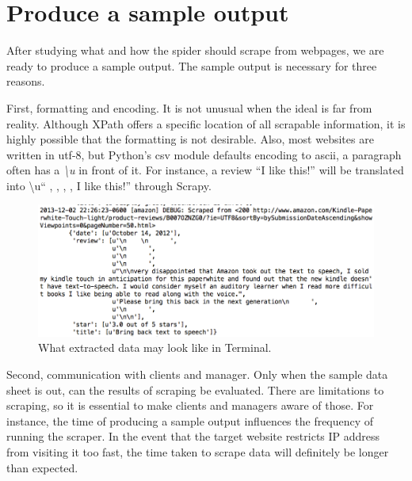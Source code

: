 \documentclass[12pt]{report}
\begin{document}
\section{Produce a sample output}

After studying what and how the spider should scrape from webpages, we are ready to produce a sample output. The sample output is necessary for three reasons.

First, formatting and encoding. It is not unusual when the ideal is far from reality. Although XPath offers a specific location of all scrapable information, it is highly possible that the formatting is not desirable. Also, most websites are written in utf-8, but Python's csv module defaults encoding to ascii, a paragraph often has a \textit{\textbackslash u} in front of it. For instance, a review ``I like this!'' will be translated into \textbackslash u``   ,    ,    ,   , I like this!'' through Scrapy.
\begin{figure}[htp]
\includegraphics[width=\textwidth]{scrapy_screenshot_terminal.png}
\caption[Scrapy screenshot in Mac Terminal]
{What extracted data may look like in Terminal.}
\end{figure}

Second, communication with clients and manager. Only when the sample data sheet is out, can the results of scraping be evaluated. There are limitations to scraping, so it is essential to make clients and managers aware of those. For instance, the time of producing a sample output influences the frequency of running the scraper. In the event that the target website restricts IP address from visiting it too fast, the time taken to scrape data will definitely be longer than expected.
\end{document}
